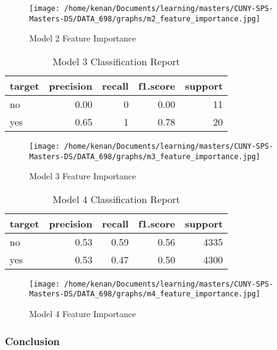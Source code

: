 \documentclass[5p]{elsarticle} %
\begin{document}
\begin{figure}
\hypertarget{id}{%
\centering
\texttt{[image: /home/kenan/Documents/learning/masters/CUNY-SPS-Masters-DS/DATA\_698/graphs/m2\_feature\_importance.jpg]}
\caption{Model 2 Feature Importance}\label{id}
}
\end{figure}

\begin{table}

\caption{\label{tab:unnamed-chunk-5}Model 3 Classification Report}
\centering
\begin{tabular}[t]{l|r|r|r|r}
\hline
target & precision & recall & f1.score & support\\
\hline
no & 0.00 & 0 & 0.00 & 11\\
\hline
yes & 0.65 & 1 & 0.78 & 20\\
\hline
\end{tabular}
\end{table}

\begin{figure}
\hypertarget{id}{%
\centering
\texttt{[image: /home/kenan/Documents/learning/masters/CUNY-SPS-Masters-DS/DATA\_698/graphs/m3\_feature\_importance.jpg]}
\caption{Model 3 Feature Importance}\label{id}
}
\end{figure}

\begin{table}

\caption{\label{tab:unnamed-chunk-6}Model 4 Classification Report}
\centering
\begin{tabular}[t]{l|r|r|r|r}
\hline
target & precision & recall & f1.score & support\\
\hline
no & 0.53 & 0.59 & 0.56 & 4335\\
\hline
yes & 0.53 & 0.47 & 0.50 & 4300\\
\hline
\end{tabular}
\end{table}

\begin{figure}
\hypertarget{id}{%
\centering
\texttt{[image: /home/kenan/Documents/learning/masters/CUNY-SPS-Masters-DS/DATA\_698/graphs/m4\_feature\_importance.jpg]}
\caption{Model 4 Feature Importance}\label{id}
}
\end{figure}

\clearpage
\twocolumn

\hypertarget{conclusion}{%
\subsubsection{Conclusion}\label{conclusion}}
\end{document}
